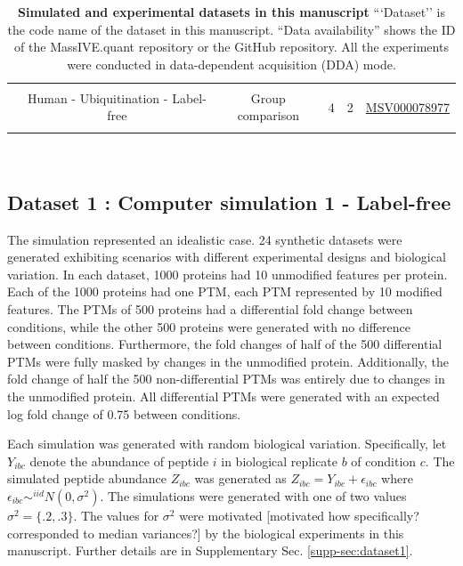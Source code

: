 \documentclass[mcp]{article}
\numberwithin{table}{section}
\def\todo#1{{\color{red}[#1]}}
\begin{document}
\begin{table}[h!]
\begin{tiny}
\begin{tabular}{|c|c|ccc|c|}
&&&&& \\%
& Human - Ubiquitination - Label-free & Group comparison & 4 & 2 & \href{https://massive.ucsd.edu/ProteoSAFe/dataset.jsp?task=1b516164de5345108b40b75147dd58b5}{MSV000078977}\\ [0.02in]
 &&&&& \\
 \hline
\end{tabular}\\
\end{tiny}
\caption{ \small {\bf Simulated and experimental datasets in this manuscript} 
```Dataset'' is the code name of the dataset in this manuscript.
``Data availability'' shows the ID of the MassIVE.quant repository or the GitHub repository. All the experiments were conducted in data-dependent acquisition (DDA) mode.
}
\label{tab:dataDescription}
\end{table}

\subsection*{Dataset 1 : Computer simulation 1 - Label-free}
\label{sec:comp_sim_procedure1}

The simulation represented an idealistic case. 24 synthetic datasets were generated exhibiting scenarios with different experimental designs and biological variation. In each dataset, 1000 proteins had 10 unmodified features per protein. Each of the 1000 proteins had one PTM, each PTM represented by 10 modified features. The PTMs of 500 proteins had a differential fold change between conditions, while the other 500 proteins were generated with no difference between conditions. Furthermore, the fold changes of half of the 500 differential PTMs were fully masked by changes in the unmodified protein. Additionally, the fold change of half the 500 non-differential PTMs was entirely due to changes in the unmodified protein. All differential PTMs were generated with an expected log fold change of 0.75 between conditions. 

Each simulation was generated with random biological variation. Specifically, let $Y_{ibc}$ denote the abundance of peptide $i$ in biological replicate $b$ of condition $c$. The simulated peptide abundance  $Z_{ibc}$ was generated as $Z_{ibc} = Y_{ibc} + \epsilon_{ibc}$ where $\epsilon_{ibc}\sim^{iid}N(0,\sigma^2)$. The simulations were generated with one of two values $\sigma^2 = \{.2, .3\}$. The values for $\sigma^2$ were motivated \todo{motivated how specifically? corresponded to median variances?}  by the biological experiments in this manuscript.
Further details are in Supplementary Sec. \ref{supp-sec:dataset1}.
\end{document}
